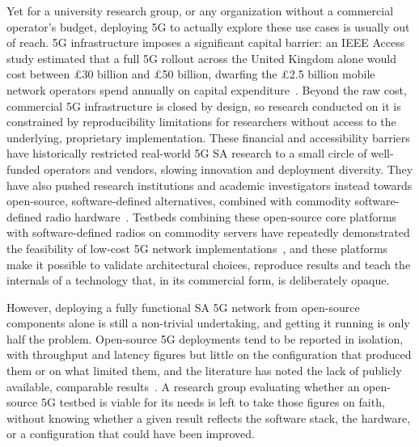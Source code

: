 Yet for a university research group, or any organization without a commercial operator's budget, deploying 5G to actually explore these use cases is usually out of reach. 5G infrastructure imposes a significant capital barrier: an IEEE Access study estimated that a full 5G rollout across the United Kingdom alone would cost between £30 billion and £50 billion, dwarfing the £2.5 billion mobile network operators spend annually on capital expenditure~\cite{patwary2020potential}. Beyond the raw cost, commercial 5G infrastructure is closed by design, so research conducted on it is constrained by reproducibility limitations for researchers without access to the underlying, proprietary implementation. These financial and accessibility barriers have historically restricted real-world 5G \gls{SA} research to a small circle of well-funded operators and vendors, slowing innovation and deployment diversity. They have also pushed research institutions and academic investigators instead towards open-source, software-defined alternatives, combined with commodity software-defined radio hardware~\cite{hasan2023building, tio2025exploring5g, mamushiane2023deploying}. Testbeds combining these open-source core platforms with software-defined radios on commodity servers have repeatedly demonstrated the feasibility of low-cost 5G network implementations~\cite{barbosa2025opensource}, and these platforms make it possible to validate architectural choices, reproduce results and teach the internals of a technology that, in its commercial form, is deliberately opaque.

However, deploying a fully functional \gls{SA} 5G network from open-source components alone is still a non-trivial undertaking, and getting it running is only half the problem. Open-source 5G deployments tend to be reported in isolation, with throughput and latency figures but little on the configuration that produced them or on what limited them, and the literature has noted the lack of publicly available, comparable results~\cite{rouili2024evaluating}. A research group evaluating whether an open-source 5G testbed is viable for its needs is left to take those figures on faith, without knowing whether a given result reflects the software stack, the hardware, or a configuration that could have been improved.


